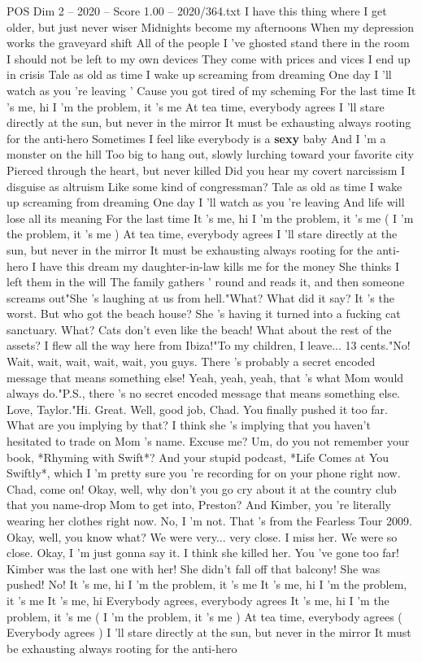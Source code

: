 \begin{textsample}{POS Dim 2 – 2020 – Score 1.00 – 2020/364.txt}  \label{ex:f2_pos_027}
I have this thing where I get older, but just never wiser Midnights become my afternoons When my depression works the graveyard shift All of the people I 've ghosted stand there in the room I should not be left to my own devices They come with prices and vices I end up in crisis Tale as old as time I wake up screaming from dreaming One day I 'll watch as you 're leaving ' Cause you got tired of my scheming For the last time It 's me, hi I 'm the problem, it 's me At tea time, everybody agrees I 'll stare directly at the sun, but never in the mirror It must be exhausting always rooting for the anti-hero Sometimes I feel like everybody is a \textbf{sexy} baby And I 'm a monster on the hill Too big to hang out, slowly lurching toward your favorite city Pierced through the heart, but never killed Did you hear my covert narcissism I disguise as altruism Like some kind of congressman?
Tale as old as time I wake up screaming from dreaming One day I 'll watch as you 're leaving And life will lose all its meaning For the last time It 's me, hi I 'm the problem, it 's me ( I 'm the problem, it 's me ) At tea time, everybody agrees I 'll stare directly at the sun, but never in the mirror It must be exhausting always rooting for the anti-hero I have this dream my daughter-in-law kills me for the money She thinks I left them in the will The family gathers ' round and reads it, and then someone screams out"She 's laughing at us from hell."What?
What did it say?
It 's the worst.
But who got the beach house?
She 's having it turned into a fucking cat sanctuary.
What?
Cats don't even like the beach!
What about the rest of the assets?
I flew all the way here from Ibiza!"To my children, I leave... 13 cents."No!
Wait, wait, wait, wait, wait, you guys.
There 's probably a secret encoded message that means something else!
Yeah, yeah, yeah, that 's what Mom would always do."P.S., there 's no secret encoded message that means something else.
Love, Taylor."Hi.
Great.
Well, good job, Chad.
You finally pushed it too far.
What are you implying by that?
I think she 's implying that you haven't hesitated to trade on Mom 's name.
Excuse me?
Um, do you not remember your book, *Rhyming with Swift*?
And your stupid podcast, *Life Comes at You Swiftly*, which I 'm pretty sure you 're recording for on your phone right now.
Chad, come on!
Okay, well, why don't you go cry about it at the country club that you name-drop Mom to get into, Preston?
And Kimber, you 're literally wearing her clothes right now.
No, I 'm not.
That 's from the Fearless Tour 2009.
Okay, well, you know what?
We were very... very close.
I miss her.
We were so close.
Okay, I 'm just gonna say it.
I think she killed her.
You 've gone too far!
Kimber was the last one with her!
She didn't fall off that balcony!
She was pushed!
No!
It 's me, hi I 'm the problem, it 's me It 's me, hi I 'm the problem, it 's me It 's me, hi Everybody agrees, everybody agrees It 's me, hi I 'm the problem, it 's me ( I 'm the problem, it 's me ) At tea time, everybody agrees ( Everybody agrees ) I 'll stare directly at the sun, but never in the mirror It must be exhausting always rooting for the anti-hero

\end{textsample}
